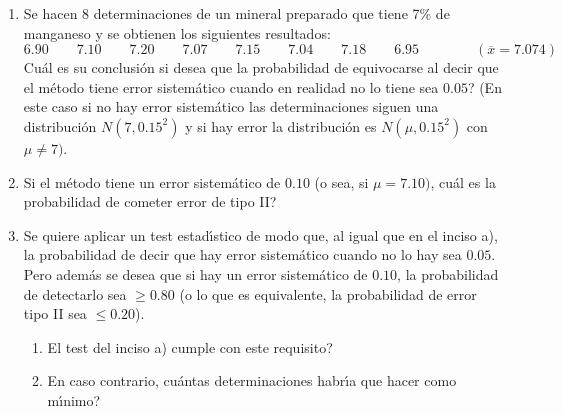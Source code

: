 \documentclass[11pt,a4paper,twoside]{article}%
\begin{document}
\begin{enumerate}
\begin{enumerate}
\item Se hacen 8 determinaciones de un mineral preparado que tiene 7\% de
manganeso y se obtienen los siguientes resultados:%
\[
6.90\qquad7.10\qquad7.20\qquad7.07\qquad7.15\qquad7.04\qquad7.18\qquad
6.95\qquad\qquad(\overline{x}=7.074)
\]
\textquestiondown Cu\'{a}l es su conclusi\'{o}n si desea que la probabilidad
de equivocarse al decir que el m\'{e}todo tiene error sistem\'{a}tico cuando
en realidad no lo tiene sea $0.05$? (En este caso si no hay error
sistem\'{a}tico las determinaciones siguen una distribuci\'{o}n $N(7,0.15^{2}%
)$ y si hay error la distribuci\'{o}n es $N(\mu,0.15^{2})$ con $\mu\neq7)$.

\item Si el m\'{e}todo tiene un error sistem\'{a}tico de $0.10$ (o sea, si
$\mu=7.10)$, \textquestiondown cu\'{a}l es la probabilidad de cometer error de
tipo II?

\item Se quiere aplicar un test estad\'{\i}stico de modo que, al igual que en
el inciso a), la probabilidad de decir que hay error sistem\'{a}tico cuando no
lo hay sea $0.05$. Pero adem\'{a}s se desea que si hay un error
sistem\'{a}tico de $0.10$, la probabilidad de detectarlo sea $\geq0.80$ (o lo
que es equivalente, la probabilidad de error tipo II sea $\leq0.20$).

\begin{enumerate}
\item El test del inciso a) \textquestiondown cumple con este requisito?

\item En caso contrario, \textquestiondown cu\'{a}ntas determinaciones
habr\'{\i}a que hacer como m\'{\i}nimo?
\end{enumerate}
\end{enumerate}


\end{enumerate}
\end{document}
